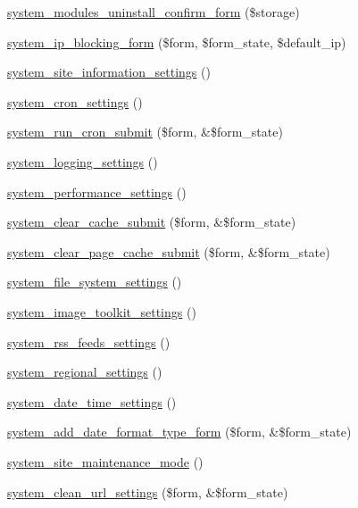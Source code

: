 \begin{DoxyCompactItemize}
\item 
\hyperlink{group__forms_ga3006c568c437410b5fedb4c6d68ddbf4}{system\_\-modules\_\-uninstall\_\-confirm\_\-form} (\$storage)
\item 
\hyperlink{group__forms_gac3f2a53aa9b70f6366568d557701d163}{system\_\-ip\_\-blocking\_\-form} (\$form, \$form\_\-state, \$default\_\-ip)
\item 
\hyperlink{group__forms_ga80e6b3130e47d51243151f1aa04742a3}{system\_\-site\_\-information\_\-settings} ()
\item 
\hyperlink{group__forms_ga62cfa00c0b29765c5c4fa670e222b522}{system\_\-cron\_\-settings} ()
\item 
\hyperlink{group__forms_ga81d2d4dbfd508cdcafdd808cda332b7c}{system\_\-run\_\-cron\_\-submit} (\$form, \&\$form\_\-state)
\item 
\hyperlink{group__forms_ga3404b7ca761c74436c88ce61aa664c4d}{system\_\-logging\_\-settings} ()
\item 
\hyperlink{group__forms_ga47b1f34bfff2f44fd22cfc866bff59d7}{system\_\-performance\_\-settings} ()
\item 
\hyperlink{group__forms_ga07cc959f377e07b079d9875fc5c4b1b7}{system\_\-clear\_\-cache\_\-submit} (\$form, \&\$form\_\-state)
\item 
\hyperlink{group__forms_ga583e36fa591f3e82feae6bf41b597aac}{system\_\-clear\_\-page\_\-cache\_\-submit} (\$form, \&\$form\_\-state)
\item 
\hyperlink{group__forms_gab0199bde08bcb49ff536dd4987718632}{system\_\-file\_\-system\_\-settings} ()
\item 
\hyperlink{group__forms_gaefe85833f426aa428f4ac75d641d7631}{system\_\-image\_\-toolkit\_\-settings} ()
\item 
\hyperlink{group__forms_gacff83234fa52dbaaf85c122bd300a374}{system\_\-rss\_\-feeds\_\-settings} ()
\item 
\hyperlink{group__forms_gac25147c52d45f3bfa503aaac07287826}{system\_\-regional\_\-settings} ()
\item 
\hyperlink{group__forms_ga2c5e3711c4a19fa4759efcee41487070}{system\_\-date\_\-time\_\-settings} ()
\item 
\hyperlink{group__forms_ga2f9c33d6203fb7a610b47158e62ed440}{system\_\-add\_\-date\_\-format\_\-type\_\-form} (\$form, \&\$form\_\-state)
\item 
\hyperlink{group__forms_gab7ca2edb8afa1a46eb6f96abda8e2208}{system\_\-site\_\-maintenance\_\-mode} ()
\item 
\hyperlink{group__forms_gacdd318d2c081ec1abcbc496e1c4c06dc}{system\_\-clean\_\-url\_\-settings} (\$form, \&\$form\_\-state)

\end{DoxyCompactItemize}
